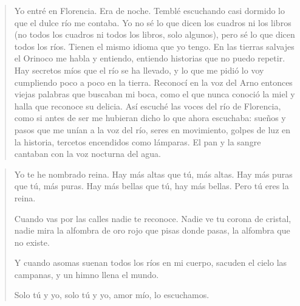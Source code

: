 \documentclass[12pt]{article}
\begin{document}
\clearpage
{}
\begin{verse}
Yo entré en Florencia. Era  
de noche. Temblé escuchando  
casi dormido lo que el dulce río  
me contaba. Yo no sé  
lo que dicen los cuadros ni los libros  
(no todos los cuadros ni todos los libros,  
solo algunos),  
pero sé lo que dicen  
todos los ríos.  
Tienen el mismo idioma que yo tengo.  
En las tierras salvajes  
el Orinoco me habla  
y entiendo, entiendo  
historias que no puedo repetir.  
Hay secretos míos  
que el río se ha llevado,  
y lo que me pidió lo voy cumpliendo  
poco a poco en la tierra.  
Reconocí en la voz del Arno entonces  
viejas palabras que buscaban mi boca,  
como el que nunca conoció la miel  
y halla que reconoce su delicia.  
Así escuché las voces  
del río de Florencia,  
como si antes de ser me hubieran dicho  
lo que ahora escuchaba:  
sueños y pasos que me unían  
a la voz del río,  
seres en movimiento,  
golpes de luz en la historia,  
tercetos encendidos como lámparas.  
El pan y la sangre cantaban  
con la voz nocturna del agua.  

\end{verse}

\clearpage
{}
\begin{verse}
Yo te he nombrado reina.  
Hay más altas que tú, más altas.  
Hay más puras que tú, más puras.  
Hay más bellas que tú, hay más bellas.  
Pero tú eres la reina.  

Cuando vas por las calles  
nadie te reconoce.  
Nadie ve tu corona de cristal, nadie mira  
la alfombra de oro rojo  
que pisas donde pasas,  
la alfombra que no existe.  

Y cuando asomas  
suenan todos los ríos  
en mi cuerpo, sacuden  
el cielo las campanas,  
y un himno llena el mundo.  

Solo tú y yo,  
solo tú y yo, amor mío,  
lo escuchamos.  

\end{verse}
\end{document}
